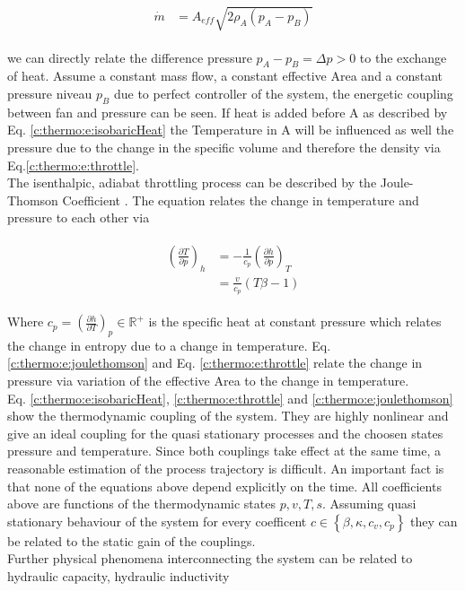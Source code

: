 \begin{align}
\begin{split}
\dot{m} & = A_{eff} \sqrt{2 \rho_A  \left( p_A -p_B \right) }
\end{split}
\label{c:thermo:e:throttle}
\end{align}

we can directly relate the difference pressure $p_A - p_B = \Delta p > 0$ to the exchange of heat. Assume a constant mass flow, a constant effective Area and a constant pressure niveau $p_B$ due to perfect controller of the system, the energetic coupling between fan and pressure can be seen. If heat is added before A as described by Eq. \ref{c:thermo:e:isobaricHeat} the Temperature in A will be influenced as well the pressure due to the change in the specific volume and therefore the density via Eq.\ref{c:thermo:e:throttle}.\\

The isenthalpic, adiabat throttling process can be described by the Joule-Thomson Coefficient \cite[p.387]{Struchtrup2014ThermodynamicsConversion}. The equation relates the change in temperature and pressure to each other via

\begin{align}
\begin{split}
\left( \frac{\partial T}{\partial p}\right)_h &= -\frac{1}{c_p} \left(\frac{\partial h}{ \partial p} \right)_T \\
&= \frac{v}{c_p}\left( T\beta - 1 \right) 
\end{split}
\label{c:thermo:e:joulethomson}
\end{align}

Where $c_p = \left(\frac{\partial h}{\partial T} \right)_p \in \mathbb{R}^+$ is the specific heat at constant pressure which relates the change in entropy due to a change in temperature.
Eq. \ref{c:thermo:e:joulethomson} and Eq. \ref{c:thermo:e:throttle} relate the change in pressure via variation of the effective Area to the change in temperature. \\

Eq. \ref{c:thermo:e:isobaricHeat}, \ref{c:thermo:e:throttle} and \ref{c:thermo:e:joulethomson} show the thermodynamic coupling of the system. They are highly nonlinear and give an ideal coupling for the quasi stationary processes and the choosen states pressure and temperature. Since both couplings take effect at the same time, a reasonable estimation of the process trajectory is difficult.\newline
An important fact is that none of the equations above depend explicitly on the time. All coefficients above are functions of the thermodynamic states $p,v,T,s$. Assuming quasi stationary behaviour of the system for every coefficent $c \in \left\lbrace \beta, \kappa, c_v, c_p \right\rbrace$ they can be related to the static gain of the couplings.\\

Further physical phenomena interconnecting the system can be related to hydraulic capacity, hydraulic inductivity 